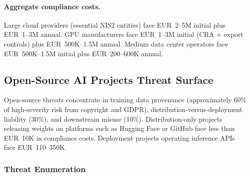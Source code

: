 \documentclass[11pt,a4paper]{article}
\begin{document}
\paragraph{Aggregate compliance costs.} Large cloud providers (essential NIS2 entities) face EUR~2--5M initial plus EUR~1--3M annual. GPU manufacturers face EUR~1--3M initial (CRA + export controls) plus EUR~500K--1.5M annual. Medium data center operators face EUR~500K--1.5M initial plus EUR~200--600K annual.


\subsection{Open-Source AI Projects Threat Surface}

Open-source threats concentrate in training data provenance (approximately 60\% of high-severity risk from copyright and GDPR), distribution-versus-deployment liability (30\%), and downstream misuse (10\%). Distribution-only projects releasing weights on platforms such as Hugging Face or GitHub face less than EUR~10K in compliance costs. Deployment projects operating inference APIs face EUR~110--350K.

\subsubsection{Threat Enumeration}
\end{document}
